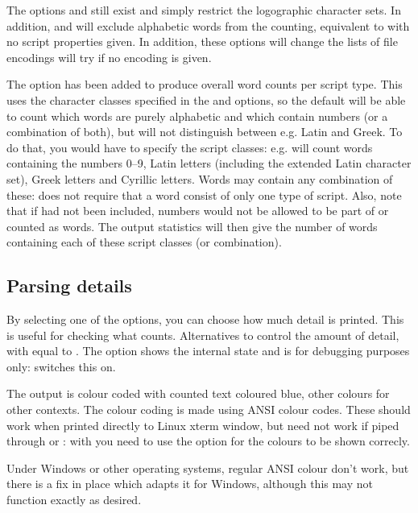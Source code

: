 \documentclass{article}
\begin{document}
The options  and  still exist and simply restrict the logographic character sets. In addition,  and  will exclude alphabetic words from the counting, equivalent to  with no script properties given. In addition, these options will change the lists of file encodings \TeXcount{} will try if no encoding is given.

The option  has been added to produce overall word counts per script type. This uses the character classes specified in the  and  options, so the default will be able to count which words are purely alphabetic and which contain numbers (or a combination of both), but will not distinguish between e.g. Latin and Greek. To do that, you would have to specify the script classes: e.g.
will count words containing the numbers 0--9, Latin letters (including the extended Latin character set), Greek letters and Cyrillic letters. Words may contain any combination of these: \TeXcount{} does not require that a word consist of only one type of script. Also, note that if  had not been included, numbers would not be allowed to be part of or counted as words. The output statistics will then give the number of words containing each of these script classes (or combination).


\subsection{Parsing details}

By selecting one of the  options, you can choose how much detail is printed. This is useful for checking what \TeXcount{} counts. Alternatives  to  control the amount of detail, with  equal to . The option  shows the internal state and is for debugging purposes only:  switches this on.

The output is colour coded with counted text coloured blue, other colours for other contexts. The colour coding is made using ANSI colour codes. These should work when printed directly to Linux xterm window, but need not work if piped through  or : with  you need to use the option  for the colours to be shown correcly.

Under Windows or other operating systems, regular ANSI colour don't work, but there is a fix in place which adapts it for Windows, although this may not function exactly as desired.
\end{document}
